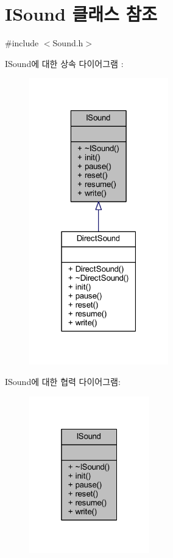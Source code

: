 \hypertarget{class_i_sound}{}\section{I\+Sound 클래스 참조}
\label{class_i_sound}


{\ttfamily \#include $<$Sound.\+h$>$}



I\+Sound에 대한 상속 다이어그램 \+: \nopagebreak
\begin{figure}[H]
\begin{center}
\leavevmode
\includegraphics[width=171pt]{class_i_sound__inherit__graph}
\end{center}
\end{figure}


I\+Sound에 대한 협력 다이어그램\+:\nopagebreak
\begin{figure}[H]
\begin{center}
\leavevmode
\includegraphics[width=148pt]{class_i_sound__coll__graph}
\end{center}
\end{figure}
